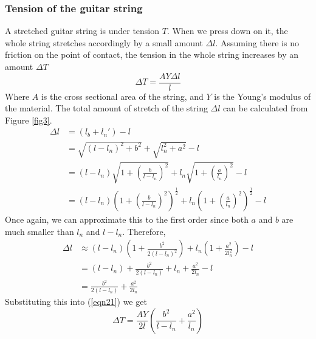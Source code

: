 \documentclass[11pt]{article}
\begin{document}
\begin{flushleft}
            \subsubsection*{Tension of the guitar string}
                A stretched guitar string is under tension $T$. When we press down on it, the whole string stretches accordingly by a small amount $\Delta l$. Assuming there is no friction on the point of contact, the tension in the whole string increases by an amount $\Delta T$
                \begin{equation}
                    \Delta T = \frac{AY\Delta l}{l}\label{eqn21}
                \end{equation} 
                Where $A$ is the cross sectional area of the string, and $Y$ is the Young's modulus of the material.
                The total amount of stretch of the string $\Delta l$ can be calculated from Figure \ref{fig3}. 
                \begin{align}
                    \Delta l &= (l_b + l_n') - l \\
                    &= \sqrt{(l-l_n)^2+b^2} + \sqrt{l_n^2+a^2} - l \\
                    &= (l-l_n)\sqrt{1+\left(\frac{b}{l-l_n}\right)^2} + l_n\sqrt{1+\left(\frac{a}{l_n}\right)^2} - l\\
                    &= (l-l_n)\left(1+\left(\frac{b}{l-l_n}\right)^2\right)^{\frac{1}{2}} + l_n\left(1+\left(\frac{a}{l_n}\right)^2\right)^{\frac{1}{2}} - l
                \end{align}
                Once again, we can approximate this to the first order since both $a$ and $b$ are much smaller than $l_n$ and $l-l_n$. Therefore,
                \begin{align}
                    \Delta l &\approx (l-l_n)\left(1+\frac{b^2}{2(l-l_n)^2}\right)+ l_n\left(1+\frac{a^2}{2l_n^2}\right) - l \label{eqn26} \\
                    &= (l - l_n) + \frac{b^2}{2(l-l_n)} + l_n + \frac{a^2}{2l_n} - l \\
                    &= \frac{b^2}{2(l-l_n)} + \frac{a^2}{2l_n}
                \end{align}
                Substituting this into (\ref{eqn21}) we get
                \begin{equation}
                    \Delta T = \frac{AY}{2l} \left( \frac{b^2}{l-l_n} + \frac{a^2}{l_n} \right) \label{eqn29}
                \end{equation}

\end{flushleft}
\end{document}
